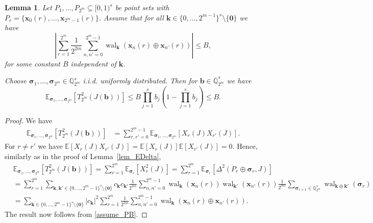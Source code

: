 \documentclass[12pt]{article}
\newtheorem{lemma}[theorem]{Lemma}
\theoremstyle{definition}
\numberwithin{equation}{section}
\begin{document}
\begin{lemma}\label{lem_EDeltaP2}
Let $P_1, \ldots, P_{2^m} \subseteq [0,1)^s$ be point sets with $P_r = \{\bm{x}_0(r), \ldots, \bm{x}_{2^m-1}(r)\}$. 
Assume that for all $\bm{k} \in \{0, \ldots, 2^{m-1}\}^s \setminus \{\bm{0}\}$ we have
\begin{equation}\label{assume_PB}
\left| \sum_{r=1}^{2^m} \frac{1}{2^{2m}} \sum_{n, n'=0}^{2^m-1} \operatorname{wal}_{\bm{k}}(\bm{x}_n(r) \oplus \bm{x}_{n'}(r)) \right| \le B,
\end{equation}
for some constant $B$ independent of $\bm{k}$.

Choose  $\bm{\sigma}_1, \ldots, \bm{\sigma}_{2^m} \in \mathbb{Q}_{2^m}^s$ i.i.d. uniformly distributed. Then for  $\bm{b} \in \overline{\mathbb{Q}}_{2^m}^s$ we have
\begin{equation*}
\mathbb{E}_{\bm{\sigma}_1, \ldots, \bm{\sigma}_{2^m}} [ T_{2^m}^2(J(\bm{b}))] \le B \prod_{j=1}^s b_j \left( 1 - \prod_{j=1}^s b_j \right) \le B.
\end{equation*}
\end{lemma}

\begin{proof}
We have
\begin{align*}
\mathbb{E}_{\bm{\sigma}_1, \ldots, \bm{\sigma}_{2^m}}[ T_{2^m}^2(J(\bm{b}))]  
& = \sum_{r, r'=0}^{2^m-1} \mathbb{E}_{\bm{\sigma}_1, \ldots, \bm{\sigma}_{2^m}} [ X_r(J) X_{r'}(J) ].
\end{align*}
For $r \neq r'$ we have $\mathbb{E}[X_r(J) X_{r'}(J)] = \mathbb{E}[X_r(J)] \mathbb{E}[X_{r'}(J)] = 0$. Hence, similarly as in the proof of Lemma~\ref{lem_EDelta},
\begin{align*}
& \mathbb{E}_{\bm{\sigma}_1, \ldots, \bm{\sigma}_{2^m}}[ T_{2^m}^2(J(\bm{b}))]   = \sum_{r =1}^{2^m } \mathbb{E}_{ \bm{\sigma}_{r }} [ X^2_r(J) ]  =  \sum_{r=1}^{2^m} \mathbb{E}_{\bm{\sigma}_{r}} [ \Delta^2( P_r \oplus \bm{\sigma}_r, J)] \\ & = \sum_{r=1}^{2^m} \sum_{\bm{k}, \bm{k}' \in \{0, \ldots, 2^m-1\}^s \setminus \{\bm{0}\}} c_{\bm{k}} c_{\bm{k}'} \frac{1}{2^{2m}} \sum_{n, n' = 0}^{2^m-1} \operatorname{wal}_{\bm{k}}(\bm{x}_n(r)) \operatorname{wal}_{\bm{k}'}(\bm{x}_{n'}(r)) \frac{1}{2^{ms}} \sum_{\bm{\sigma}_{r+1} \in \mathbb{Q}_{2^m}^s} \operatorname{wal}_{\bm{k} \oplus \bm{k}'}(\bm{\sigma}_{r}) \\ & =  \sum_{\bm{k} \in \{0, \ldots, 2^m-1\}^s \setminus \{\bm{0}\}} | c_{\bm{k}} |^2 \sum_{r=1}^{2^m} \frac{1}{2^{2m}} \sum_{n, n' = 0}^{2^m-1} \operatorname{wal}_{\bm{k}}(\bm{x}_n(r) \oplus \bm{x}_{n'}(r)). 
\end{align*}
The result now follows from \eqref{assume_PB}.
\end{proof}
\end{document}

